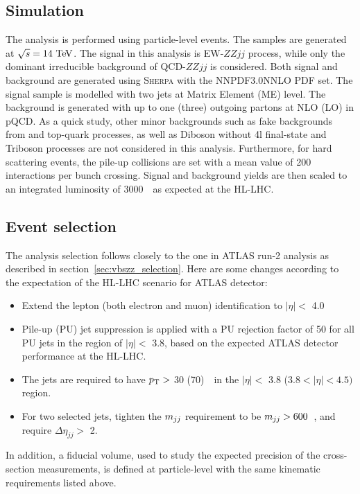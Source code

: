 \subsection{Simulation}

The analysis is performed using particle-level events.
The samples are generated at $\sqrt{s} = 14~\text{Te\kern -0.1em V}$. %
The signal in this analysis is EW-$ZZjj$ process, while only the dominant irreducible background of QCD-$ZZjj$ is considered.
Both signal and background are generated using \textsc{Sherpa} with the NNPDF3.0NNLO PDF set.
The signal sample is modelled with two jets at Matrix Element (ME) level.
The background is generated with up to one (three) outgoing partons at NLO (LO) in pQCD.
As a quick study, other minor backgrounds such as fake backgrounds from \Zjet and top-quark processes, as well as Diboson without 4l final-state and Triboson processes are not considered in this analysis.
Furthermore, for hard scattering events, the pile-up collisions are set with a mean value of 200 interactions per bunch crossing.
Signal and background yields are then scaled to an integrated luminosity of 3000~\ifb~as expected at the HL-LHC.

\subsection{Event selection}

The analysis selection follows closely to the one in ATLAS run-2 analysis as described in section~\ref{sec:vbszz_selection}.
Here are some changes according to the expectation of the HL-LHC scenario for ATLAS detector:
\begin{itemize}
	\item Extend the lepton (both electron and muon) identification to $|\eta| <$ 4.0
	\item Pile-up (PU) jet suppression is applied with a PU rejection factor of 50 for all PU jets in the region of $|\eta| <$ 3.8, based on the expected ATLAS detector performance at the HL-LHC.
	\item The jets are required to have $p_{\text{T}} >$ 30 (70)~\gev~in the $|\eta| <$ 3.8 ($3.8 < |\eta| < 4.5)$ region.
	\item For two selected jets, tighten the $m_{jj}$ requirement to be $m_{jj} > 600$~\gev, and require $\Delta \eta_{jj} >$ 2.
\end{itemize}
In addition, a fiducial volume, used to study the expected precision of the cross-section measurements,
 is defined at particle-level with the same kinematic requirements listed above.

